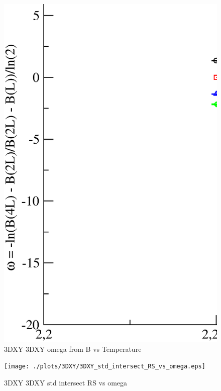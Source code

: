 \begin{figure}[!htpb]
  \centering
  \includegraphics[width=\textwidth]{./plots/3DXY/3DXY_omega_from_B_vs_Temperature.eps}
  \caption{3DXY 3DXY omega from B vs Temperature}
\end{figure}

\begin{figure}[!htpb]
  \centering
  \texttt{[image: ./plots/3DXY/3DXY\_std\_intersect\_RS\_vs\_omega.eps]}
  \caption{3DXY 3DXY std intersect RS vs omega}
\end{figure}

